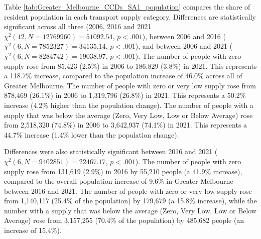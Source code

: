 \documentclass[preprint, 3p,
authoryear]{elsarticle} %
\begin{document}
Table \ref{tab:Greater_Melbourne_CCDs_SA1_population} compares the share
of resident population in each transport supply category. Differences
are statistically significant across all three (2006, 2016 and 2021
\(\chi^2(12, N = 12769960) = 51092.54\), \(p < .001\)), between 2006 and
2016 (\(\chi^2(6, N = 7852327) = 34135.14\), \(p < .001\)), and between
2006 and 2021 (\(\chi^2(6, N = 8284742) = 19038.97\), \(p < .001\)). The
number of people with zero supply rose from 85,423 (2.5\%) in 2006 to
186,829 (3.8\%) in 2021. This represents a 118.7\% increase, compared to
the population increase of 46.0\% across all of Greater Melbourne. The
number of people with zero or very low supply rose from 878,469 (26.1\%)
in 2006 to 1,319,796 (26.8\%) in 2021. This represents a 50.2\% increase
(4.2\% higher than the population change). The number of people with a
supply that was below the average (Zero, Very Low, Low or Below Average)
rose from 2,518,320 (74.8\%) in 2006 to 3,642,937 (74.1\%) in 2021. This
represents a 44.7\% increase (1.4\% lower than the population change).

Differences were also statistically significant between 2016 and 2021
(\(\chi^2(6, N = 9402851) = 22467.17\), \(p < .001\)). The number of
people with zero supply rose from 131,619 (2.9\%) in 2016 by 55,210
people (a 41.9\% increase), compared to the overall population increase
of 9.6\% in Greater Melbourne between 2016 and 2021. The number of
people with zero or very low supply rose from 1,140,117 (25.4\% of the
population) by 179,679 (a 15.8\% increase), while the number with a
supply that was below the average (Zero, Very Low, Low or Below Average)
rose from 3,157,255 (70.4\% of the population) by 485,682 people (an
increase of 15.4\%).
\end{document}
